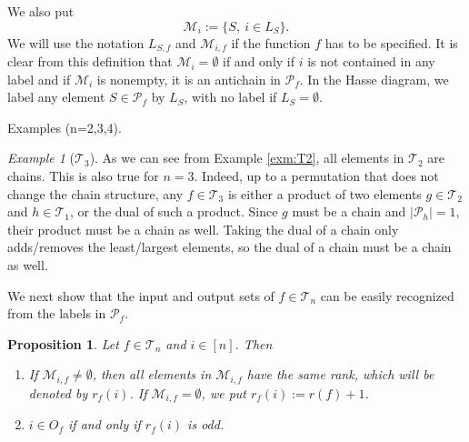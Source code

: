 \documentclass[12pt]{article}
\newtheorem{prop}{Proposition}
\theoremstyle{definition}
\theoremstyle{remark}
\newtheorem{exm}{Example}
\def\Me{\mathcal M}
\def\Te{\mathcal T}
\def\Pe{\mathcal P}
\begin{document}
We also put
\[
\Me_i:=\{S,\ i\in L_S\}.
\]
We will use the notation $L_{S,f}$ and $\Me_{i,f}$ if the function $f$ has to be
specified. It is clear from this definition that $\Me_i=\emptyset$ if and only if $i$ is
not contained in any label and  if $\Me_i$ is nonempty, it is an antichain in
$\Pe_f$.   
In the Hasse diagram, we label any element  $S\in \Pe_f$ by  $L_S$, with no label if
$L_S=\emptyset$.

Examples (n=2,3,4).
\begin{exm}[$\Te_3$]
As we can see from Example \ref{exm:T2}, all elements in $\Te_2$ are chains. This is
also true for $n=3$. Indeed, up to a permutation that does not change the chain structure, 
any $f\in \Te_3$ is either a product of two elements $g\in \Te_2$ and $h\in \Te_1$,
or the dual of such a  product. Since $g$ must be a chain and $|\Pe_h|=1$, their product
must be a chain as well. Taking the dual of a chain only adds/removes the least/largest
elements, so the dual of a chain must be a chain as well.
\end{exm}



We next show that the input and output sets of $f\in \Te_n$ can be easily recognized from
the labels in $\Pe_f$. 

\begin{prop}\label{prop:pfinput} Let $f\in \Te_n$ and $i\in [n]$. Then
\begin{enumerate}
\item If $\Me_{i,f}\ne
\emptyset$, then all elements in $\Me_{i,f}$  have the same rank,  which will be
denoted by $r_f(i)$. If $\Me_{i,f}=\emptyset$, we put $r_f(i):=r(f)+1$. 
\item $i\in O_f$ if and only if $r_f(i)$ is odd.

\end{enumerate}
\end{prop}
\end{document}
